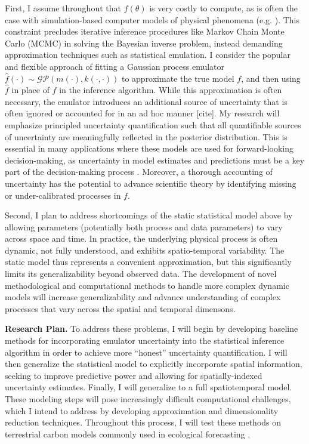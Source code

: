 \documentclass[12pt]{article}
\begin{document}
First, I assume throughout that $f(\theta)$ is very costly to compute, as is often the case with simulation-based computer models of physical phenomena (e.g. \cite{Fer}). 
This constraint precludes iterative inference procedures like Markov Chain Monte Carlo (MCMC) in solving the Bayesian inverse problem, instead demanding 
approximation techniques such as statistical emulation. I consider the popular and flexible approach of fitting a Gaussian process emulator 
$\hat{f}(\cdot) \sim \mathcal{GP}(m(\cdot), k(\cdot, \cdot))$ to approximate the true model $f$, and then using $\hat{f}$ in place of $f$ in the inference algorithm.
 While this approximation is often necessary, the emulator introduces an additional source of uncertainty that is often ignored or accounted for in an ad hoc manner [cite]. My research will emphasize
 principled uncertainty quantification such that all quantifiable sources of uncertainty are meaningfully reflected in the posterior distribution. This is essential in many applications
 where these models are used for forward-looking decision-making, as uncertainty in model estimates and predictions must be a key part of the decision-making process \cite{Dietze}.
 Moreover, a thorough accounting of uncertainty has the potential to advance scientific theory by identifying missing or under-calibrated processes in $f$. 
 
 Second, I plan to address shortcomings of the static statistical model above by allowing parameters (potentially both process and data parameters) to vary across space 
 and time. In practice, the underlying physical process is often dynamic, not fully understood, and exhibits spatio-temporal variability. The static model thus 
 represents a convenient approximation, but this significantly limits its generalizability beyond observed data. The development of novel methodological and computational 
 methods to handle more complex dynamic models will increase generalizability and advance understanding of complex processes that vary across the spatial and 
 temporal dimensons. 

\noindent
\textbf{Research Plan.} To address these problems, I will begin by developing baseline methods for incorporating emulator uncertainty into the statistical inference algorithm in order to achieve more ``honest'' uncertainty quantification. I will then generalize the statistical model to explicitly incorporate spatial information, seeking to improve predictive power and allowing for spatially-indexed uncertainty estimates. Finally, I will generalize to a full spatiotemporal model. These modeling steps will pose increasingly difficult computational challenges, which I intend to address by developing approximation and dimensionality reduction techniques. Throughout this process, I will test these methods on terrestrial carbon models commonly used in ecological forecasting \cite{Dietze}. 
 
\end{document}
